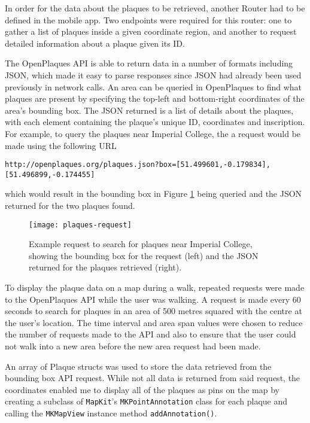 In order for the data about the plaques to be retrieved, another Router had to be defined in the mobile app. Two endpoints were required for this router: one to gather a list of plaques inside a given coordinate region, and another to request detailed information about a plaque given its ID.

The OpenPlaques API is able to return data in a number of formats including JSON, which made it easy to parse responses since JSON had already been used previously in network calls. An area can be queried in OpenPlaques to find what plaques are present by specifying the top-left and bottom-right coordinates of the area's bounding box. The JSON returned is a list of details about the plaques, with each element containing the plaque's unique ID, coordinates and inscription. For example, to query the plaques near Imperial College, the a request would be made using the following URL

\vspace{-0.5cm}
\begin{center}
  \verb|http://openplaques.org/plaques.json?box=[51.499601,-0.179834],[51.496899,-0.174455]|
\end{center}

which would result in the bounding box in Figure \ref{fig:plaques-request} being queried and the JSON returned for the two plaques found.


\begin{figure}[hbt]
  \centering
  \texttt{[image: plaques-request]}
  \caption{Example request to search for plaques near Imperial College, showing the bounding box for the request (left) and the JSON returned for the plaques retrieved (right).}
  \label{fig:plaques-request}
\end{figure}


To display the plaque data on a map during a walk, repeated requests were made to the OpenPlaques API while the user was walking. A request is made every 60 seconds to search for plaques in an area of 500 metres squared with the centre at the user's location. The time interval and area span values were chosen to reduce the number of requests made to the API and also to ensure that the user could not walk into a new area before the new area request had been made.

An array of Plaque structs was used to store the data retrieved from the bounding box API request. While not all data is returned from said request, the coordinates enabled me to display all of the plaques as pins on the map by creating a subclass of \verb|MapKit|'s \verb|MKPointAnnotation| class for each plaque and calling the \verb|MKMapView| instance method \verb|addAnnotation()|.

